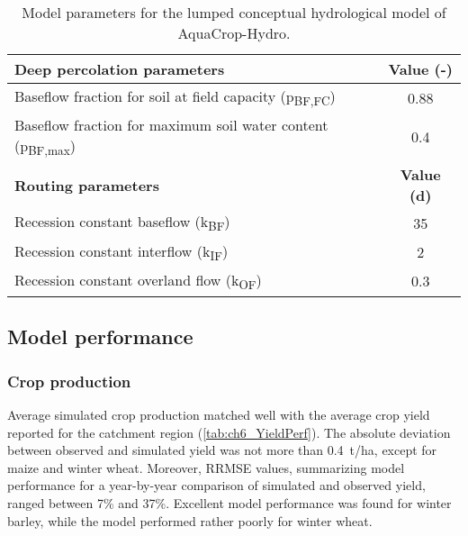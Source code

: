 \begin{table}[htbp]
\centering
\begin{tabularx}{\textwidth}{Xc}
  	\caption{Model parameters for the lumped conceptual hydrological model of AquaCrop-Hydro. \label{tab:ch6_hydropar}}\\
\toprule
\textbf{Deep percolation parameters} & \textbf{Value (-)} \\
\midrule
Baseflow fraction for soil at field capacity (p\textsubscript{BF,FC}) & 0.88 \\
Baseflow fraction for maximum soil water content (p\textsubscript{BF,max}) & 0.4 \\
\midrule
\textbf{Routing parameters} & \textbf{Value (\si{d})} \\
Recession constant baseflow (k\textsubscript{BF}) & 35 \\
Recession constant interflow (k\textsubscript{IF}) & 2 \\
Recession constant overland flow (k\textsubscript{OF}) & 0.3 \\
\bottomrule
\end{tabularx}%
  \end{table}

\subsection{Model performance}
\subsubsection{Crop production}
Average simulated crop production matched well with the average crop yield reported for the catchment region (\autoref{tab:ch6_YieldPerf}). The absolute deviation between observed and simulated yield was not more than \SI{0.4}{t/ha}, except for maize and winter wheat. Moreover, RRMSE values, summarizing model performance for a year-by-year comparison of simulated and observed yield, ranged between 7\% and 37\%. Excellent model performance was found for winter barley, while the model performed rather poorly for winter wheat. 


